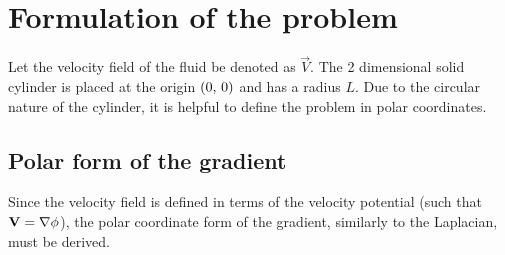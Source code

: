 \section{Formulation of the problem}
Let the velocity field of the fluid be denoted as $\vec{V}$. The 2 dimensional solid cylinder is placed at the origin $\left(0,\,0\right)$ and has a radius $L$. Due to the circular nature of the cylinder,
it is helpful to define the problem in polar coordinates.

\subsection{Polar form of the gradient}\label{section:polar-gradient}
Since the velocity field is defined in terms of the velocity potential (such that $\mathbf{V}=\nabla\phi$), the polar coordinate form of the gradient, similarly to the Laplacian, must be derived.
